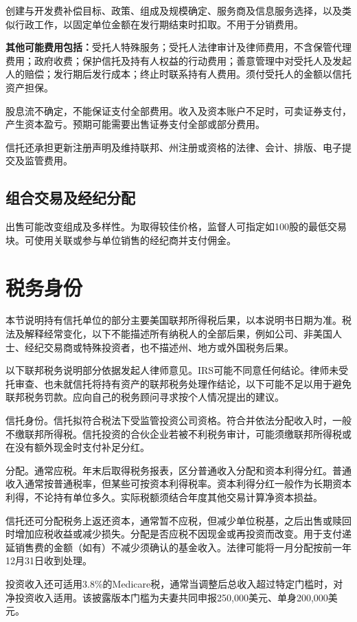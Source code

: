 \documentclass[UTF8,fontset=none,11pt,a4paper]{ctexart}
\begin{document}
创建与开发费补偿目标、政策、组成及规模确定、服务商及信息服务选择，以及类似行政工作，以固定单位金额在发行期结束时扣取。不用于分销费用。


\textbf{其他可能费用包括：}受托人特殊服务；受托人法律审计及律师费用，不含保管代理费用；政府收费；保护信托及持有人权益的行动费用；善意管理中对受托人及发起人的赔偿；发行期后发行成本；终止时联系持有人费用。须付受托人的金额以信托资产担保。


股息流不确定，不能保证支付全部费用。收入及资本账户不足时，可卖证券支付，产生资本盈亏。预期可能需要出售证券支付全部或部分费用。


信托还承担更新注册声明及维持联邦、州注册或资格的法律、会计、排版、电子提交及监管费用。


\subsection*{组合交易及经纪分配}
出售可能改变组成及多样性。为取得较佳价格，监督人可指定如100股的最低交易块。可使用关联或参与单位销售的经纪商并支付佣金。


\section*{税务身份}
本节说明持有信托单位的部分主要美国联邦所得税后果，以本说明书日期为准。税法及解释经常变化，以下不能描述所有纳税人的全部后果，例如公司、非美国人士、经纪交易商或特殊投资者，也不描述州、地方或外国税务后果。


以下联邦税务说明部分依据发起人律师意见。IRS可能不同意任何结论。律师未受托审查、也未就信托将持有资产的联邦税务处理作结论，以下可能不足以用于避免联邦税务罚款。应向自己的税务顾问寻求按个人情况提出的建议。


信托身份。信托拟符合税法下受监管投资公司资格。符合并依法分配收入时，一般不缴联邦所得税。信托投资的合伙企业若被不利税务审计，可能须缴联邦所得税或在没有额外现金时支付补足分红。


分配。通常应税。年末后取得税务报表，区分普通收入分配和资本利得分红。普通收入通常按普通税率，但某些可按资本利得税率。资本利得分红一般作为长期资本利得，不论持有单位多久。实际税额须结合年度其他交易计算净资本损益。


信托还可分配税务上返还资本，通常暂不应税，但减少单位税基，之后出售或赎回时增加应税收益或减少损失。分配是否应税不因现金或再投资而改变。用于支付递延销售费的金额（如有）不减少须确认的基金收入。法律可能将一月分配按前一年12月31日收到处理。


投资收入还可适用3.8\%的Medicare税，通常当调整后总收入超过特定门槛时，对净投资收入适用。该披露版本门槛为夫妻共同申报250,000美元、单身200,000美元。
\end{document}
